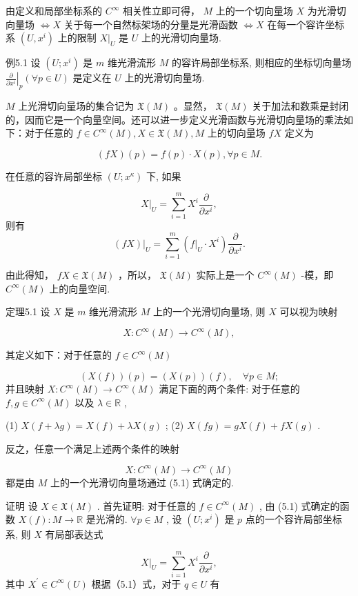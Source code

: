由定义和局部坐标系的  $C^\infty$  相关性立即可得， $M$  上的一个切向量场  $X$  为光滑切向量场  $\iff X$  关于每一个自然标架场的分量是光滑函数  $\iff X$  在每一个容许坐标系  $(U, x^i)$  上的限制  $X|_U$  是  $U$  上的光滑切向量场.

例5.1 设  $(U; x^i)$  是  $m$  维光滑流形  $M$  的容许局部坐标系, 则相应的坐标切向量场  $\left.\frac{\partial}{\partial x^i}\right|_p (\forall p \in U)$  是定义在  $U$  上的光滑切向量场.

$M$  上光滑切向量场的集合记为  $\mathfrak{X}(M)$ 。显然， $\mathfrak{X}(M)$  关于加法和数乘是封闭的，因而它是一个向量空间。还可以进一步定义光滑函数与光滑切向量场的乘法如下：对于任意的  $f \in C^{\infty}(M), X \in \mathfrak{X}(M), M$ 上的切向量场  $fX$  定义为

$$
(f X) (p) = f (p) \cdot X (p), \forall p \in M.
$$

在任意的容许局部坐标  $(U; x^{\kappa})$  下, 如果

$$
X | _ {U} = \sum_ {i = 1} ^ {m} X ^ {i} \frac {\partial}{\partial x ^ {i}},
$$
则有
$$
(f X) | _ {U} = \sum_ {i = 1} ^ {m} (f | _ {U} \cdot X ^ {i}) \frac {\partial}{\partial x ^ {i}}.
$$

由此得知，  $fX\in \mathfrak{X}(M)$  ，所以，  $\mathfrak{X}(M)$  实际上是一个  $C^\infty (M)$  -模，即 $C^\infty (M)$  上的向量空间.

定理5.1 设  $X$  是  $m$  维光滑流形  $M$  上的一个光滑切向量场, 则  $X$  可以视为映射

$$
X: C ^ {\infty} (M) \to C ^ {\infty} (M),
$$

其定义如下：对于任意的  $f \in C^{\infty}(M)$

$$
(X (f)) (p) = (X (p)) (f), \quad \forall p \in M;%
$$
并且映射  $X: C^{\infty}(M) \to C^{\infty}(M)$  满足下面的两个条件: 对于任意的  $f, g \in C^{\infty}(M)$  以及  $\lambda \in \mathbb{R}$ ,

(1)  $X(f + \lambda g) = X(f) + \lambda X(g)$ ;  
(2)  $X(fg) = gX(f) + fX(g)$ .

反之，任意一个满足上述两个条件的映射

$$
X: C ^ {\infty} (M) \to C ^ {\infty} (M)
$$
都是由  $M$  上的一个光滑切向量场通过 (5.1) 式确定的.

证明 设  $X \in \mathfrak{X}(M)$ . 首先证明: 对于任意的  $f \in C^{\infty}(M)$ , 由 (5.1) 式确定的函数  $X(f): M \to \mathbb{R}$  是光滑的.  $\forall p \in M$ , 设  $(U; x^{i})$  是  $p$  点的一个容许局部坐标系, 则  $X$  有局部表达式

$$
X | _ {U} = \sum_ {i = 1} ^ {m} X ^ {i} \frac {\partial}{\partial x ^ {i}},
$$
其中  $X^{\prime}\in C^{\infty}(U)$  根据（5.1）式，对于  $q\in U$  有

